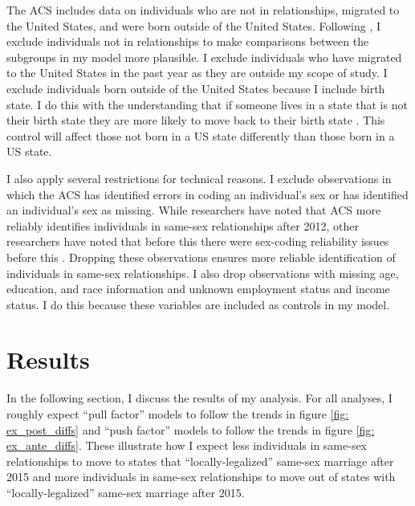 \documentclass[12pt,letterpaper]{article}
\begin{document}
\FloatBarrier


The ACS includes data on individuals who are not in relationships, migrated to the United States, and were born outside of the United States. Following \citet{1, 16}, I exclude individuals not in relationships to make comparisons between the subgroups in my model more plausible. I exclude individuals who have migrated to the United States in the past year as they are outside my scope of study. I exclude individuals born outside of the United States because I include birth state. I do this with the understanding that if someone lives in a state that is not their birth state they are more likely to move back to their birth state \citep{12}. This control will affect those not born in a US state differently than those born in a US state.

I also apply several restrictions for technical reasons. I exclude observations in which the ACS has identified errors in coding an individual’s sex or has identified an individual’s sex as missing. While researchers have noted that ACS more reliably identifies individuals in same-sex relationships after 2012, other researchers have noted that before this there were sex-coding reliability issues before this \citep{3, 5, 7, 12}. Dropping these observations ensures more reliable identification of individuals in same-sex relationships. I also drop observations with missing age, education, and race information and unknown employment status and income status. I do this because these variables are included as controls in my model.

\begin{landscape}
\begin{centering}
\begin{scriptsize}

\end{scriptsize}
\end{centering}
\end{landscape}


\clearpage

\section{Results}
In the following section, I discuss the results of my analysis. For all analyses, I roughly expect “pull factor” models to follow the trends in figure \ref{fig: ex_post_diffs} and “push factor” models to follow the trends in figure \ref{fig: ex_ante_diffs}. These illustrate how I expect less individuals in same-sex relationships to move to states that “locally-legalized” same-sex marriage after 2015 and more individuals in same-sex relationships to move out of states with “locally-legalized” same-sex marriage after 2015. 
\end{document}
